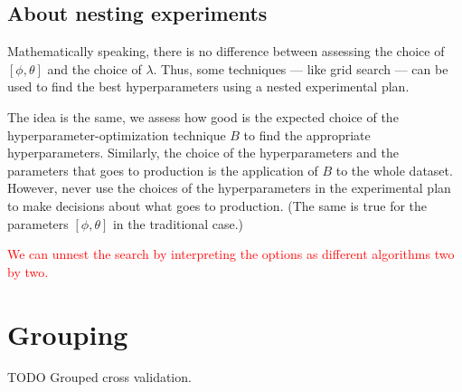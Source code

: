 \subsection{About nesting experiments}

Mathematically speaking, there is no difference between assessing the choice of
$\left[\phi, \theta\right]$ and the choice of $\lambda$.  Thus, some techniques --- like
grid search --- can be used to find the best hyperparameters using a nested experimental
plan.

The idea is the same, we assess how good is the expected choice of the
hyperparameter-optimization technique $B$ to find the appropriate hyperparameters.  Similarly,
the choice of the hyperparameters and the parameters that goes to production is the
application of $B$ to the whole dataset.  However, never use the choices of the
hyperparameters in the experimental plan to make decisions about what goes to production.
(The same is true for the parameters $\left[\phi, \theta\right]$ in the traditional case.)

\textcolor{red}{We can unnest the search by interpreting the options as different
algorithms two by two.}

\section{Grouping}

TODO Grouped cross validation.

